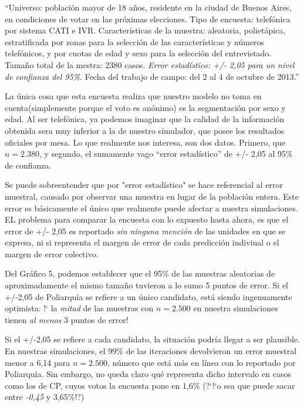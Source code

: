 \documentclass[12pt, a4paper]{article}
\begin{document}
``Universo: poblaci\'on mayor de 18 a\~nos, residente en la ciudad de Buenos Aires, en condiciones de votar en las pr\'oximas elecciones. Tipo de encuesta: telef\'onica por sistema CATI e IVR. Caracter\'isticas de la muestra: aleatoria, poliet\'apica, estratificada por zonas para la selecci\'on de las caracter\'isticas y n\'umeros telef\'onicos, y por cuotas de edad y sexo para la selecci\'on del entrevistado. Tama\~no total de la mestra: 2380 casos. \emph{Error estad\'istico: +/- 2,05 para un nivel de confianza del 95\%}. Fecha del trabajo de campo: del 2 al 4 de octubre de 2013.''

La \'unica cosa que esta encuesta realiza que nuestro modelo no toma en cuenta(simplemente porque el voto es an\'onimo) es la segmentaci\'on por sexo y edad. Al ser telef\'onica, ya podemos imaginar que la calidad de la informaci\'on obtenida sera muy inferior a la de nuestro simulador, que posee los resultados oficiales por mesa. Lo que realmente nos interesa, son dos datos. Primero, que $n=2.380$, y segundo, el sumamente vago ``error estad\'istico'' de +/- 2,05 al 95\% de confianza.

Se puede sobreentender que por "error estad\'istico" se hace referencial al error muestral, causado por observar una muestra en lugar de la poblaci\'on entera. Este error es b\'asicamente el \'unico que realmente puede afectar a nuestra simulaciones. EL problema para comparar la encuesta con lo expuesto hasta ahora, es que el error de +/- 2,05 es reportado \emph{sin ninguna menci\'on} de las unidades en que se expresa, ni si representa el margen de error de cada predicci\'on indiviual o el margen de error colectivo.

Del Gr\'afico 5, podemos establecer que el 95\% de las muestras aleatorias de aproximadamente el mismo tama\~no tuvieron a lo sumo 5 puntos de error. Si el +/-2,05 de Poliarqu\'ia se refiere a un \'unico candidato, est\'a siendo ingenuamente optimista: !` la \emph{mitad} de las muestras con $n=2.500$ en nuestra simulaciones tienen \emph{al menos} 3 puntos de error!

Si el +/-2,05 se refiere a cada candidato, la situaci\'on podr\'ia llegar a ser plausible. En nuestras simulaciones, el 99\% de las iteraciones devolvieron un error muestral menor a 6,14 para $n=2.500$, n\'umero que est\'a m\'as en l\'inea con lo reportado por Poliarqu\'ia. Sin embargo, no queda claro qu\'e representa dicho intervalo en casos como los de CP, cuyos votos la encuesta pone en 1,6\% (?`!`o sea que puede sacar entre \emph{-0,45} y 3,65\%!?) 
\end{document}
